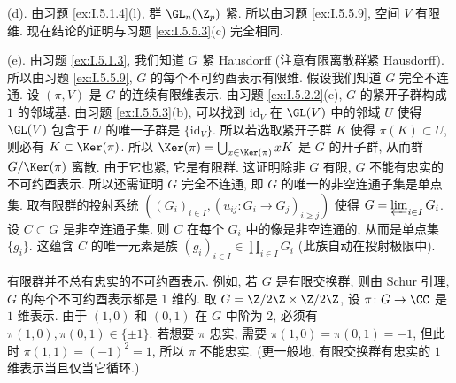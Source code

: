 \begin{solution}
(d). 由习题 \ref{ex:I.5.1.4}(l), 群 $\GL_n(\Z_p)$ 紧. 所以由习题 \ref{ex:I.5.5.9}, 空间 $V$ 有限维. 现在结论的证明与习题 \ref{ex:I.5.5.3}(c) 完全相同.

(e). 由习题 \ref{ex:I.5.1.3}, 我们知道 $G$ 紧 Hausdorff (注意有限离散群紧 Hausdorff). 所以由习题 \ref{ex:I.5.5.9}, $G$ 的每个不可约酉表示有限维.
假设我们知道 $G$ 完全不连通. 设 $(\pi, V)$ 是 $G$ 的连续有限维表示. 由习题 \ref{ex:I.5.2.2}(c), $G$ 的紧开子群构成 $1$ 的邻域基. 由习题 \ref{ex:I.5.5.3}(b), 可以找到 $\mathrm{id}_V$ 在 $\GL(V)$ 中的邻域 $U$ 使得 $\GL(V)$ 包含于 $U$ 的唯一子群是 $\{\mathrm{id}_V\}$. 所以若选取紧开子群 $K$ 使得 $\pi(K) \subset U$, 则必有 $K \subset \Ker(\pi)$. 所以 $\Ker(\pi) = \bigcup_{x \in \Ker(\pi)}xK$ 是 $G$ 的开子群, 从而群 $G/\Ker(\pi)$ 离散. 由于它也紧, 它是有限群. 这证明除非 $G$ 有限, $G$ 不能有忠实的不可约酉表示.
所以还需证明 $G$ 完全不连通, 即 $G$ 的唯一的非空连通子集是单点集. 取有限群的投射系统 $((G_i)_{i \in I}, (u_{ij} \colon G_i \to G_j)_{i \geq j})$ 使得 $G = \varprojlim_{i \in I}G_i$. 设 $C \subset G$ 是非空连通子集. 则 $C$ 在每个 $G_i$ 中的像是非空连通的, 从而是单点集 $\{g_i\}$. 这蕴含 $C$ 的唯一元素是族 $(g_i)_{i \in I} \in \prod_{i \in I}G_i$ (此族自动在投射极限中).
\end{solution}

\begin{remarkstar}
有限群并不总有忠实的不可约酉表示. 例如, 若 $G$ 是有限交换群, 则由 Schur 引理, $G$ 的每个不可约酉表示都是 $1$ 维的. 取 $G = \Z/2\Z \times \Z/2\Z$, 设 $\pi \colon G \to \CC$ 是 $1$ 维表示. 由于 $(1, 0)$ 和 $(0, 1)$ 在 $G$ 中阶为 $2$, 必须有 $\pi(1, 0), \pi(0, 1) \in \{\pm 1\}$. 若想要 $\pi$ 忠实, 需要 $\pi(1, 0) = \pi(0, 1) = -1$, 但此时 $\pi(1, 1) = (-1)^2 = 1$, 所以 $\pi$ 不能忠实. (更一般地, 有限交换群有忠实的 $1$ 维表示当且仅当它循环.)
\end{remarkstar}


